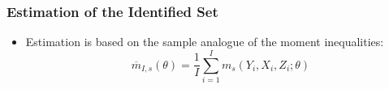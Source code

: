 \documentclass[10pt,letterpaper]{beamer}
\begin{document}
\begin{frame}[label=estset]
\frametitle{Estimation of the Identified Set}

\begin{itemize}
	\item Estimation is based on the sample analogue of the moment inequalities:
	\begin{equation*}
	\overline{m}_{I,s}(\theta)=\frac{1}{I}\sum_{i=1}^{I}m_{s}(Y_{i},X_{i},Z_{i};\theta)
	\end{equation*}
	\begin{figure}[h!]
	\begin{center}
	\end{center}
	\end{figure}	
\end{itemize}
\hyperlink{estsetb}{}
\end{frame}
\end{document}
